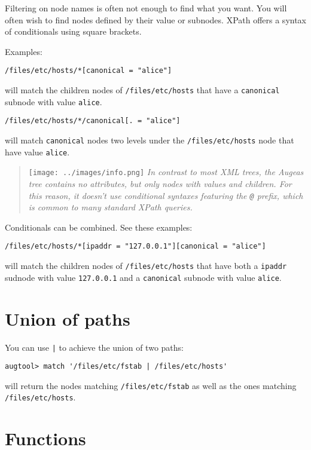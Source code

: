 Filtering on node names is often not enough to find what you want. You will often wish to find nodes defined by their value or subnodes. XPath offers a syntax of conditionals using square brackets.

Examples:

\begin{verbatim}
/files/etc/hosts/*[canonical = "alice"]
\end{verbatim}
will match the children nodes of \nolinkurl{/files/etc/hosts} that have a \verb!canonical! subnode with value \verb!alice!.

\begin{verbatim}
/files/etc/hosts/*/canonical[. = "alice"]
\end{verbatim}
will match \verb!canonical! nodes two levels under the \nolinkurl{/files/etc/hosts} node that have value \verb!alice!.

\begin{quote}
\texttt{[image: ../images/info.png]} \emph{In contrast to most XML trees, the Augeas tree contains no attributes, but only nodes with values and children. For this reason, it doesn't use conditional syntaxes featuring the \texttt{@} prefix, which is common to many standard XPath queries.}

\end{quote}
Conditionals can be combined. See these examples:

\begin{verbatim}
/files/etc/hosts/*[ipaddr = "127.0.0.1"][canonical = "alice"]
\end{verbatim}
will match the children nodes of \nolinkurl{/files/etc/hosts} that have both a \verb!ipaddr! sudnode with value \verb!127.0.0.1! and a \verb!canonical! subnode with value \verb!alice!.

\section{Union of paths}

You can use \verb!|! to achieve the union of two paths:

\begin{verbatim}
augtool> match '/files/etc/fstab | /files/etc/hosts'
\end{verbatim}
will return the nodes matching \nolinkurl{/files/etc/fstab} as well as the ones matching \nolinkurl{/files/etc/hosts}.

\section{Functions}

